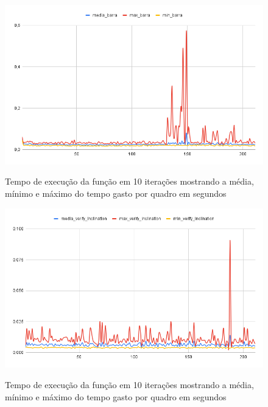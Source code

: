 \begin{figure}[H]
	\centering
	\caption{Tempo de execução da função  em 10 iterações mostrando a média, mínimo e máximo do tempo gasto por quadro em segundos}
	\includegraphics[scale=0.5]{figuras/grafico/barra.png}
	\label{graf:G1}
\end{figure}

\begin{figure}[H]
	\centering
	\caption{Tempo de execução da função  em 10 iterações mostrando a média, mínimo e máximo do tempo gasto por quadro em segundos}
	\includegraphics[scale=0.5]{figuras/grafico/inclination.png}
	\label{graf:G2}
\end{figure}



